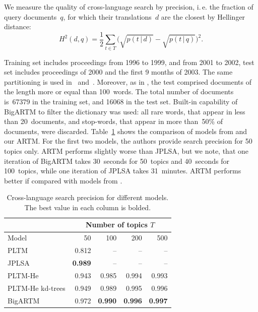 \documentclass{acm_proc_article-sp}
\newcommand{\cond}{\mspace{3mu}{|}\mspace{3mu}}
\begin{document}
We measure the quality of cross-language search by precision,
i.\,e. the fraction of query documents~$q$, for which their translations~$d$ are the closest by
Hellinger distance:
\[
    H^2(d,q)= \frac12 \sum_{t\in T} \bigl( \sqrt{p(t\cond d)} - \sqrt{p(t\cond q)} \bigr)^2 .
\]

Training set includes proceedings from 1996 to 1999, and from 2001 to 2002,
test set includes proceedings of 2000 and the first 9 months of 2003.
The same partitioning is used in~\cite{platt10translingual} and~\cite{mimno12sparse}.
Moreover, as in \cite{mimno09polylingual,mimno12sparse},
the test comprised documents of the length more or equal than 100~words.
The total number of documents is~67379 in the training set, and 16068 in the test set.
Built-in capability of BigARTM to filter the dictionary was used:
all rare words, that appear in less than 20~documents, and stop-words, that appear in more than~50\% of documents, were discarded.
Table~\ref{tab:cross-lingual} shows the comparison of
models from \cite{mimno09polylingual,platt10translingual,mimno12sparse} and our ARTM.
For the first two models, the authors provide search precision for 50 topics only.
ARTM performs slightly worse than JPLSA, but we note, that
one iteration of BigARTM takes 30~seconds for 50~topics and 40~seconds for 100~topics,
while one iteration of JPLSA takes 31~minutes.
ARTM performs better if compared with models from \cite{mimno12sparse}.

\begin{table}[t]
\caption{Cross-language search precision for different models. The best value in each column is bolded.}
\label{tab:cross-lingual}
\medskip\centering\tabcolsep=4.3pt
\begin{tabular}{l|rrrr}
\hline
	& \multicolumn{4}{c}{Number of topics $T$} \\
\hline
Model &	50	&100	&200	&500 \\
\hline
PLTM \cite{mimno09polylingual}          &0.812  &  --  &  --  &  --  \\
JPLSA \cite{platt10translingual}        &\textbf{0.989}  &  --  &  --  &  --  \\
PLTM-He \cite{mimno12sparse}            &0.943  &0.985 &0.994 &0.993 \\
PLTM-He kd-trees \cite{mimno12sparse}	&0.949	&0.989 &0.995 &0.996 \\
\hline
BigARTM	                                &0.972	&\textbf{0.990} &\textbf{0.996} &\textbf{0.997} \\
\hline
\end{tabular}
\end{table}
\end{document}
